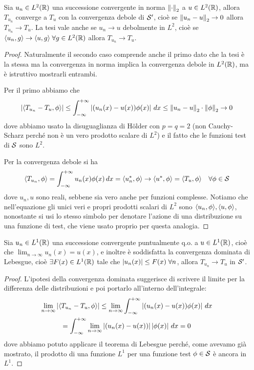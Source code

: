 \begin{lemma}[  ]
  Sia $ u_n \in L^2(\R) $ una successione convergente in norma $ \norm{\cdot}_2 $ a $ u \in L^2(\R) $, allora $ T_{u_n} $ converge a $ T_u $ 
  con la convergenza debole di $ \S' $, cioè se $ \norm{u_n - u}_2 \to 0 $ allora $ T_{u_n} \to T_u $. 
  La tesi vale anche se $ u_n \to u $ debolmente in $ L^2 $, cioè se $ \sc{u_n, g} \to \sc{u, g} \; \forall g \in L^2(\R) $  allora $ T_{u_n} \to T_u $.
\end{lemma}
\begin{proof}
  Naturalmente il secondo caso comprende anche il primo dato che la tesi è la stessa ma la convergenza in norma implica la convergenza debole in 
  $ L^2(\R) $, ma è istruttivo mostrarli entrambi. 
  
  Per il primo abbiamo che 
  \begin{align}
    \abs{\sc{T_{u_n} - T_u , \phi}} \leq \int_{-\infty}^{+\infty} \abs{(u_n(x) - u(x))\phi(x)}\,dx \leq \norm{u_n - u}_2 \cdot \norm{\phi}_2 \to 0
  \end{align}
  dove abbiamo usato la disuguaglianza di Hölder con $ p = q = 2 $ (non Cauchy-Scharz perché non è un vero prodotto scalare di $ L^2 $) e il fatto che 
  le funzioni test di $ \S $ sono $ L^2 $.

  Per la convergenza debole si ha
  \begin{align}
    \sc{T_{u_n}, \phi} = \int_{-\infty}^{+\infty} {u_n(x)\phi(x)}\,dx = \sc{u_n^*, \phi} \to \sc{u^*, \phi} = \sc{T_u, \phi} \quad \forall \phi \in \S
  \end{align}
  dove $ u_n, u $ sono reali, sebbene sia vero anche per funzioni complesse. Notiamo che nell'equazione gli unici veri e propri prodotti scalari 
  di $ L^2 $ sono $ \sc{u_n, \phi} , \sc{u, \phi} $, nonostante si usi lo stesso simbolo per denotare l'azione di una distribuzione su una funzione di 
  test, che viene usato proprio per questa analogia.
\end{proof}

\begin{lemma}[  ]
  Sia $ u_n \in L^1(\R) $ una successione convergente puntualmente q.o. a $ u \in L^1(\R) $, cioè che $ \lim_{n \to \infty} u_n(x) = u(x) $, e inoltre 
  è soddisfatta la convergenza dominata di Lebesgue, cioè $ \exists F(x) \in L^1(\R) $ tale che $ \abs{u_n(x)} \leq F(x) \; \forall n $, 
  allora $ T_{u_n} \to T_u $ in $ \S' $.
\end{lemma}
\begin{proof}
  L'ipotesi della convergenza dominata suggerisce di scrivere il limite per la differenza delle distribuzioni e poi portarlo all'interno dell'integrale: 
  \begin{gather}
    \lim_{n\to \infty} \abs{\sc{T_{u_n} - T_u , \phi}} \leq \lim_{n\to \infty} \int_{-\infty}^{+\infty} \abs{(u_n(x) - u(x))\phi(x)}\,dx 
    \\
    = \int_{-\infty}^{+\infty} \lim_{n\to \infty} \abs{(u_n(x) - u(x))} \abs{\phi(x)}\,dx = 0
  \end{gather}
  dove abbiamo potuto applicare il teorema di Lebesgue perché, come avevamo già mostrato, il prodotto di una funzione $ L^1 $ per una funzione test 
  $ \phi \in \S $ è ancora in $ L^1 $.
\end{proof}

